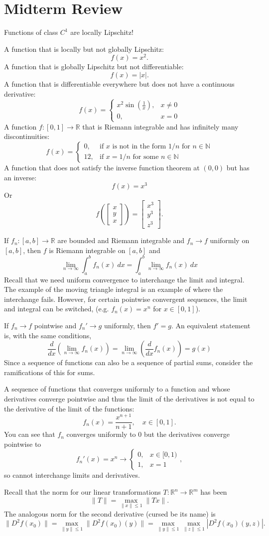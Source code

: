 \documentclass[11pt]{article}
\theoremstyle{definition}
\newcommand{\R}{\mathbb{R}}                      %
\newcommand{\N}{\mathbb{N}}
\newcommand{\mat}{\begin{bmatrix}}
\newcommand{\trix}{\end{bmatrix}}
\begin{document}
\section{Midterm Review}
Functions of class $C^1$ are locally Lipschitz!

\ex A function that is locally but not globally Lipschitz:
$$
f(x)=x^2.
$$
\ex A function that is globally Lipschitz but not differentiable:
$$
f(x)=|x|.
$$
\ex A function that is differentiable everywhere but does not have a continuous derivative:
$$
f(x)=\begin{cases}
    x^2\sin\left(\frac{1}{x}\right), &x\neq0\\
    0, &x=0
\end{cases}
$$
\ex A function $f:[0,1]\to\R$ that is Riemann integrable and has infinitely many discontinuities:
$$
f(x)=\begin{cases}
    0, &\mbox{if } x \mbox{ is not in the form } 1/n \mbox{ for } n\in\N\\
    12, &\mbox{if } x=1/n \mbox{ for some } n\in\N
\end{cases}
$$
\ex A function that does not satisfy the inverse function theorem at $(0,0)$ but has an inverse:
$$
f(x)=x^3
$$
Or 
$$
f\left(\mat x\\y\\x \trix \right)=\mat x^3 \\ y^3 \\ z^3 \trix.
$$

\note If $f_n:[a,b]\to \R$ are bounded and Riemann integrable and $f_n\to f$ uniformly on $[a,b]$, then $f$ is Riemann integrable on $[a,b]$ and 
$$
\lim_{n\to \infty}\int_a^b f_n(x)~dx = \int_a^b \lim_{n\to\infty} f_n(x)~dx
$$
Recall that we need uniform convergence to interchange the limit and integral. The example of the moving triangle integral is an example of where the interchange fails. However, for certain pointwise convergent sequences, the limit and integral can be switched, (e.g. $f_n(x)=x^n$ for $x\in[0,1]$).

\note If $f_n\to f$ pointwise and $f_n'\to g$ uniformly, then $f'=g$. An equivalent statement is, with the same conditions,
$$
\frac{d}{dx}\left(\lim_{n\to\infty} f_n(x)\right)=\lim_{n\to \infty} \left(\frac{d}{dx}f_n(x)\right)=g(x)
$$
Since a sequence of functions can also be a sequence of partial sums, consider the ramifications of this for sums.

\ex A sequence of functions that converges uniformly to a function and whose derivatives converge pointwise and thus the limit of the derivatives is not equal to the derivative of the limit of the functions:
$$
f_n(x)=\frac{x^{n+1}}{n+1}, \quad x\in[0,1].
$$
You can see that $f_n$ converges uniformly to 0 but the derivatives converge pointwise to
$$
f_n'(x)=x^n\to \begin{cases}
    0, &x\in[0,1)\\
    1, &x=1
\end{cases},
$$
so cannot interchange limits and derivatives. 

\note Recall that the norm for our linear transformations $T:\R^n\to\R^m$ has been
$$
\|T\|=\max_{\|x\|\leq 1}\|Tx\|.
$$
The analogous norm for the second derivative (cursed be its name) is
$$
\|D^2f(x_0)\|=\max_{\|y\|\leq 1}\|D^2f(x_0)(y)\|=\max_{\|y\|\leq 1}\max_{\|z\|\leq 1}|D^2f(x_0)(y,z)|.
$$
\end{document}
